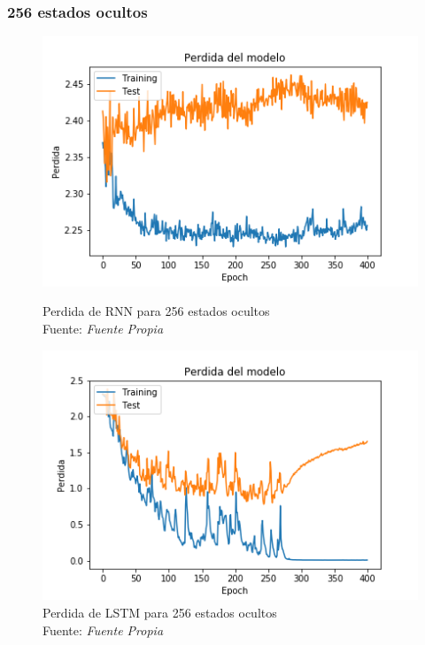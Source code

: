 \subsubsection{256 estados ocultos}\label{256statecost}
\begin{figure}[H]
	\centering
	\includegraphics[width=0.7\linewidth]{Figures/rnn_256_cost}
	\caption{Perdida de RNN para 256 estados ocultos\\ Fuente: {\textit{Fuente Propia}}}
	\label{fig:rnn256cost}

	\centering
	\includegraphics[width=0.7\linewidth]{Figures/lstm_256_cost13}
	\caption{Perdida de LSTM para 256 estados ocultos\\ Fuente: {\textit{Fuente Propia}}}
	\label{fig:lstm256cost13}
\end{figure}

